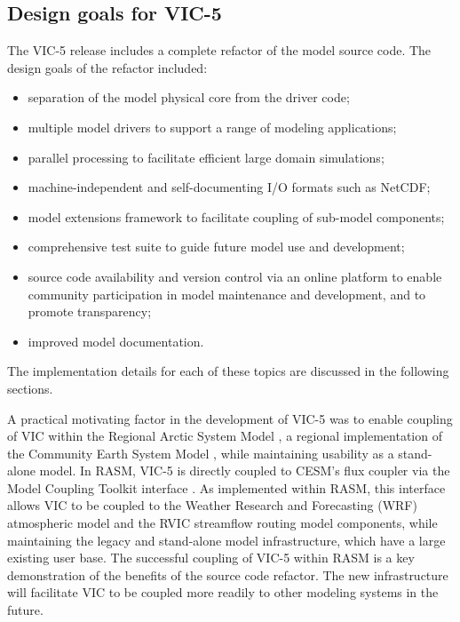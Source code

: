 \documentclass[gmd, manuscript]{copernicus}
\begin{document}
  \subsection{Design goals for VIC-5}
    \label{sec:vic-5}
    The VIC-5 release includes a complete refactor of the model source code. The design goals of the refactor included:

    \begin{itemize}
      \item separation of the model physical core from the driver code;
      \item multiple model drivers to support a range of modeling applications;
      \item parallel processing to facilitate efficient large domain simulations;
      \item machine-independent and self-documenting I/O formats such as NetCDF;
      \item model extensions framework to facilitate coupling of sub-model components;
      \item comprehensive test suite to guide future model use and development;
      \item source code availability and version control via an online platform to enable community participation in model maintenance and development, and to promote transparency;
      \item improved model documentation.
    \end{itemize}
    The implementation details for each of these topics are discussed in the following sections.

    A practical motivating factor in the development of VIC-5 was to enable coupling of VIC within the Regional Arctic System Model \citep[RASM;][]{Hamman_2016a}, a regional implementation of the Community Earth System Model \citep[CESM;][]{Hurrell_2013}, while maintaining usability as a stand-alone model. In RASM, VIC-5 is directly coupled to CESM's flux coupler \citep[CPL7;][]{Craig_2012} via the Model Coupling Toolkit interface \citep[MCT;][]{Larson_2005}. As implemented within RASM, this interface allows VIC to be coupled to the Weather Research and Forecasting (WRF) atmospheric model \citep{Skamarock_2008} and the RVIC streamflow routing model \citep{Hamman_2017a} components, while maintaining the legacy and stand-alone model infrastructure, which have a large existing user base. The successful coupling of VIC-5 within RASM is a key demonstration of the benefits of the source code refactor. The new infrastructure will facilitate VIC to be coupled more readily to other modeling systems in the future.
\end{document}
